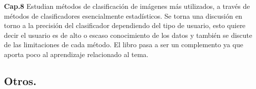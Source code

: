 \documentclass[letterpaper,12pt]{article}
\begin{document}
\begin{itemize}
\textbf{Cap.8} Estudian métodos de clasificación de imágenes más utilizados, a través de métodos de clasificadores esencialmente estadísticos. Se torna una discusión en torno a la precisión del clasificador dependiendo del tipo de usuario, esto quiere decir el usuario es de alto o escaso conocimiento de los datos y también se discute de las limitaciones de cada método. El libro pasa a ser un complemento ya que aporta poco al aprendizaje relacionado al tema. 


\end{itemize}


\subsection{Otros.}
\end{document}
